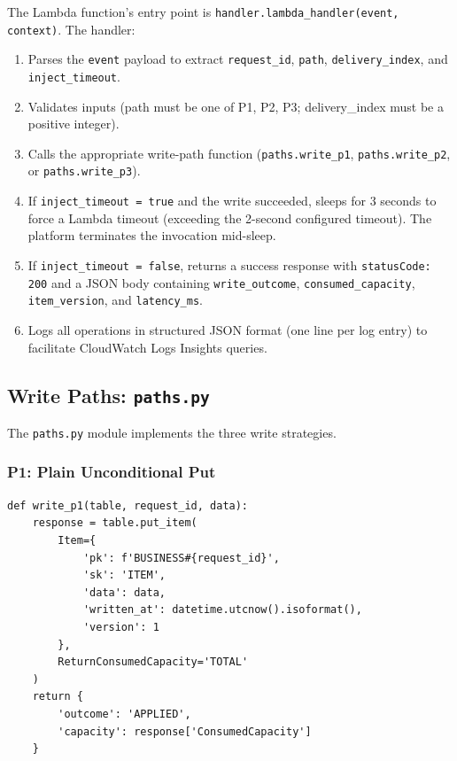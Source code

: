 The Lambda function's entry point is \texttt{handler.lambda\_handler(event, context)}. The handler:

\begin{enumerate}
    \item Parses the \texttt{event} payload to extract \texttt{request\_id}, \texttt{path}, \texttt{delivery\_index}, and \texttt{inject\_timeout}.
    \item Validates inputs (path must be one of P1, P2, P3; delivery\_index must be a positive integer).
    \item Calls the appropriate write-path function (\texttt{paths.write\_p1}, \texttt{paths.write\_p2}, or \texttt{paths.write\_p3}).
    \item If \texttt{inject\_timeout = true} and the write succeeded, sleeps for 3 seconds to force a Lambda timeout (exceeding the 2-second configured timeout). The platform terminates the invocation mid-sleep.
    \item If \texttt{inject\_timeout = false}, returns a success response with \texttt{statusCode: 200} and a JSON body containing \texttt{write\_outcome}, \texttt{consumed\_capacity}, \texttt{item\_version}, and \texttt{latency\_ms}.
    \item Logs all operations in structured JSON format (one line per log entry) to facilitate CloudWatch Logs Insights queries.
\end{enumerate}

\subsection{Write Paths: \texttt{paths.py}}

The \texttt{paths.py} module implements the three write strategies.

\subsubsection{P1: Plain Unconditional Put}

\begin{verbatim}
def write_p1(table, request_id, data):
    response = table.put_item(
        Item={
            'pk': f'BUSINESS#{request_id}',
            'sk': 'ITEM',
            'data': data,
            'written_at': datetime.utcnow().isoformat(),
            'version': 1
        },
        ReturnConsumedCapacity='TOTAL'
    )
    return {
        'outcome': 'APPLIED',
        'capacity': response['ConsumedCapacity']
    }
\end{verbatim}

